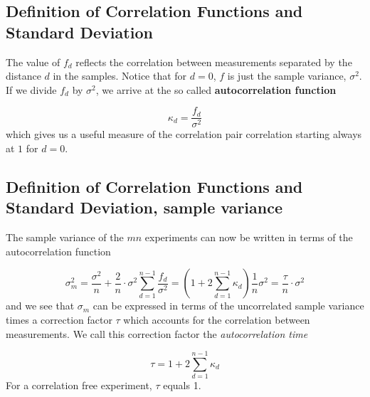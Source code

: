 \documentclass[%
oneside,                 %
final,                   %
10pt]{article}
\newenvironment{block_mdfboxadmon}[1][]{
\begin{block_mdfboxmdframed}[frametitle=#1]
}
{
\end{block_mdfboxmdframed}
}
\begin{document}
\subsection{Definition of Correlation Functions and Standard Deviation}

\begin{block_mdfboxadmon}[]
The value of $f_d$ reflects the correlation between measurements
separated by the distance $d$ in the samples.  Notice that for
$d=0$, $f$ is just the sample variance, $\sigma^2$. If we divide $f_d$
by $\sigma^2$, we arrive at the so called \textbf{autocorrelation function}

\begin{equation}
\kappa_d = \frac{f_d}{\sigma^2}
\label{eq:autocorrelformal}
\end{equation}
which gives us a useful measure of the correlation pair correlation
starting always at $1$ for $d=0$.
\end{block_mdfboxadmon} %



\subsection{Definition of Correlation Functions and Standard Deviation, sample variance}

\begin{block_mdfboxadmon}[]

The sample variance of the $mn$ experiments can now be
written in terms of the autocorrelation function

\begin{equation}
\sigma_m^2=\frac{\sigma^2}{n}+\frac{2}{n}\cdot\sigma^2\sum_{d=1}^{n-1}
\frac{f_d}{\sigma^2}=\left(1+2\sum_{d=1}^{n-1}\kappa_d\right)\frac{1}{n}\sigma^2=\frac{\tau}{n}\cdot\sigma^2
\label{eq:error_estimate_corr_time}
\end{equation}
and we see that $\sigma_m$ can be expressed in terms of the
uncorrelated sample variance times a correction factor $\tau$ which
accounts for the correlation between measurements. We call this
correction factor the \emph{autocorrelation time}

\begin{equation}
\tau = 1+2\sum_{d=1}^{n-1}\kappa_d
\label{eq:autocorrelation_time}
\end{equation}
For a correlation free experiment, $\tau$
equals 1.
\end{block_mdfboxadmon} %
\end{document}
